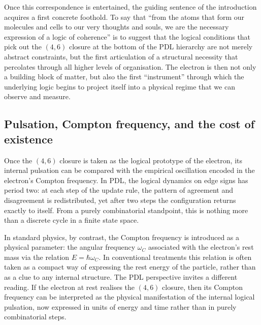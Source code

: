 \documentclass[11pt,a4paper]{article}
\theoremstyle{definition}
\begin{document}
Once this correspondence is entertained, the guiding sentence of the introduction acquires a first concrete foothold. To say that ``from the atoms that form our molecules and cells to our very thoughts and souls, we are the necessary expression of a logic of coherence'' is to suggest that the logical conditions that pick out the \((4,6)\) closure at the bottom of the PDL hierarchy are not merely abstract constraints, but the first articulation of a structural necessity that percolates through all higher levels of organisation. The electron is then not only a building block of matter, but also the first ``instrument'' through which the underlying logic begins to project itself into a physical regime that we can observe and measure.\cite{Laubscher_Existence_PulsatingClosure_2026,Laubscher_PDL_GlobalMapping_v6_2024}

\subsection{Pulsation, Compton frequency, and the cost of existence}

Once the \((4,6)\) closure is taken as the logical prototype of the electron, its internal pulsation can be compared with the empirical oscillation encoded in the electron’s Compton frequency.\cite{Laubscher_EmergencePhysicalReality_2024,Laubscher_Schrodinger_Compat_v2_2024} In PDL, the logical dynamics on edge signs has period two: at each step of the update rule, the pattern of agreement and disagreement is redistributed, yet after two steps the configuration returns exactly to itself.\cite{Laubscher_MinimalClosures_46_2024} From a purely combinatorial standpoint, this is nothing more than a discrete cycle in a finite state space.

In standard physics, by contrast, the Compton frequency is introduced as a physical parameter: the angular frequency \(\omega_C\) associated with the electron’s rest mass via the relation \(E = \hbar \omega_C\). In conventional treatments this relation is often taken as a compact way of expressing the rest energy of the particle, rather than as a clue to any internal structure. The PDL perspective invites a different reading. If the electron at rest realises the \((4,6)\) closure, then its Compton frequency can be interpreted as the physical manifestation of the internal logical pulsation, now expressed in units of energy and time rather than in purely combinatorial steps.\cite{Laubscher_EmergencePhysicalReality_2024,Laubscher_Existence_PulsatingClosure_2026}
\end{document}
